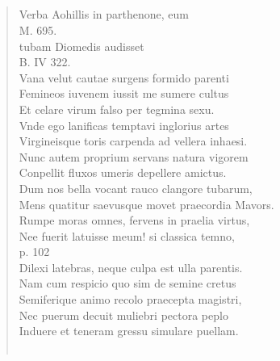 \documentclass[11pt, a4paper]{report}
\begin{document}
            \subsection*{}
      \begin{verse}
      Verba Aohillis in parthenone, eum \\ M. 695. \\ tubam Diomedis audisset \\ B. IV 322. \\ Vana velut cautae surgens formido parenti \\ Femineos iuvenem iussit me sumere cultus \\ Et celare virum falso per tegmina sexu. \\ Vnde ego lanificas temptavi inglorius artes \\ Virgineisque toris carpenda ad vellera inhaesi. \\ Nunc autem proprium servans natura vigorem \\ Conpellit fluxos umeris depellere amictus. \\ Dum nos bella vocant rauco clangore tubarum, \\ Mens quatitur saevusque movet praecordia Mavors. \\ Rumpe moras omnes, fervens in praelia virtus, \\ Nee fuerit latuisse meum! si classica temno, \\ p. 102 \\ Dilexi latebras, neque culpa est ulla parentis. \\ Nam cum respicio quo sim de semine cretus \\ Semiferique animo recolo praecepta magistri, \\ Nec puerum decuit muliebri pectora peplo \\ Induere et teneram gressu simulare puellam. \\ 
        ﻿\pagebreak 

\end{verse}
\end{document}
